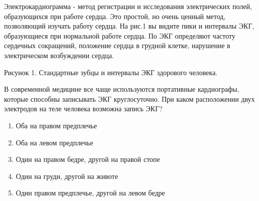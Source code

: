 
Электрокардиограмма - метод
регистрации и исследования электрических полей, образующихся при работе сердца.
Это простой, но очень ценный метод, позволяющий изучать работу сердца. На рис.1
вы видите пики и интервалы ЭКГ, образующиеся при нормальной работе сердца. По
ЭКГ определяют частоту сердечных сокращений, положение сердца в грудной клетке,
нарушение в электрическом возбуждении сердца.


Рисунок 1. Стандартные зубцы и интервалы ЭКГ здорового человека.

В современной
медицине все чаще используются портативные кардиографы, которые способны
записывать ЭКГ круглосуточно. При каком расположении двух электродов на теле
человека возможна запись ЭКГ?

\begin{enumerate}
    \item Оба на правом предплечье
    \item Оба на левом предплечье
    \item Один на правом бедре, другой на правой стопе
    \item Один на груди, другой на животе
    \item Один правом предплечье, другой на левом бедре
\end{enumerate}

